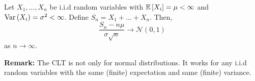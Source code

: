 \begin{theorem}
    Let $X_1, \ldots, X_n$ be i.i.d random variables with $\mathbb{E}\left[ X_i \right] = \mu < \infty$ and $\text{Var}\left( X_i \right) = \sigma^2 < \infty$. Define $S_n = X_1 + \ldots + X_n$. Then, \[ \frac{S_n - n \mu}{\sigma \sqrt{n}} \to \mathcal{N}(0, 1) \] as $n \to \infty$. 
\end{theorem}

\textbf{Remark:} The CLT is not only for normal distributions. It works for any i.i.d random variables with the same (finite) expectation and same (finite) variance. 